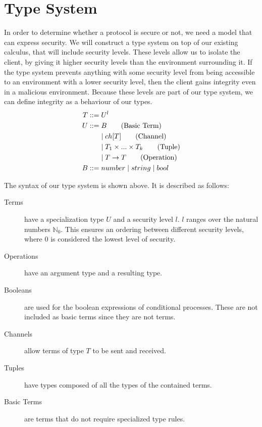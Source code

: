 \section{Type System}\label{ch:type-security}
In order to determine whether a protocol is secure or not, we need a model that can express security.
We will construct a type system on top of our existing calculus, that will include security levels.
These levels allow us to isolate the client, by giving it higher security levels than the environment surrounding it.
If the type system prevents anything with some security level from being accessible to an environment with a lower security level, then the client gains integrity even in a malicious environment.
Because these levels are part of our type system, we can define integrity as a behaviour of our types.
\begin{align*}
    T::=&\;U^l\\    	
    U::=&\;B \tag{Basic Term}\\
        &\mid ch[T] \tag{Channel}\\
        &\mid T_1 \times...\times T_k \tag{Tuple}\\
        &\mid T\rightarrow T \tag{Operation}\\
    B::=&\;number 
        \mid string
        \mid bool\\
\end{align*}

\noindent The syntax of our type system is shown above. It is described as follows:

\begin{description}
    \item[Terms] have a specialization type $U$ and a security level $l$.
        $l$ ranges over the natural numbers $\mathbb{N}_0$.
        This ensures an ordering between different security levels, where $0$ is considered the lowest level of security.
    \item[Operations] have an argument type and a resulting type.
    \item[Booleans] are used for the boolean expressions of conditional processes.
        These are not included as basic terms since they are not terms.
    \item[Channels] allow terms of type $T$ to be sent and received.
    \item[Tuples] have types composed of all the types of the contained terms.
    \item[Basic Terms] are terms that do not require specialized type rules.
\end{description}

